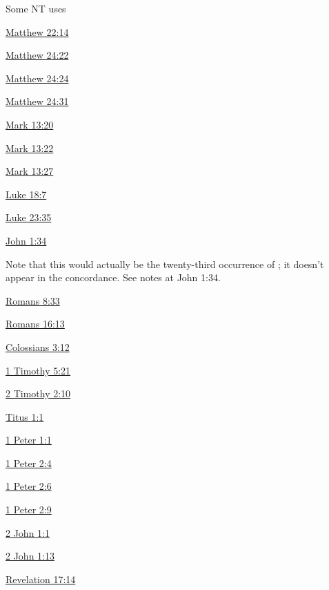 				\begin{compactdesc}
					\item[Some NT uses] \textbf{}
						\begin{compactdesc}
							\item[{\hyperref[MATTHEW-22-14]{Matthew 22:14}}]
							\item[{\hyperref[MATTHEW-24-22]{Matthew 24:22}}]
							\item[{\hyperref[MATTHEW-24-24]{Matthew 24:24}}]
							\item[{\hyperref[MATTHEW-24-31]{Matthew 24:31}}]
							\item[{\hyperref[MARK-13-20]{Mark 13:20}}]
							\item[{\hyperref[MARK-13-22]{Mark 13:22}}]
							\item[{\hyperref[MARK-13-27]{Mark 13:27}}]
							\item[{\hyperref[LUKE-18-7]{Luke 18:7}}]
							\item[{\hyperref[LUKE-23-35]{Luke 23:35}}]
							\item[{\hyperref[JOHN-1-34]{John 1:34}}] 
								\begin{compactitem}
									\item Note that this would actually be the twenty-third occurrence of ; it doesn't appear in the concordance. See notes at John 1:34.
								\end{compactitem}
							\item[{\hyperref[ROMANS-8-33]{Romans 8:33}}]
							\item[{\hyperref[ROMANS-16-13]{Romans 16:13}}]
							\item[{\hyperref[COLOSSIANS-3-12]{Colossians 3:12}}]
							\item[{\hyperref[1TIMOTHY-5-21]{1 Timothy 5:21}}]
							\item[{\hyperref[2TIMOTHY-2-10]{2 Timothy 2:10}}]
							\item[{\hyperref[TITUS-1-1]{Titus 1:1}}]
							\item[{\hyperref[1PETER-1-1]{1 Peter 1:1}}]
							\item[{\hyperref[1PETER-2-4]{1 Peter 2:4}}]
							\item[{\hyperref[1PETER-2-6]{1 Peter 2:6}}]
							\item[{\hyperref[1PETER-2-9]{1 Peter 2:9}}]
							\item[{\hyperref[2JOHN-1-1]{2 John 1:1}}]
							\item[{\hyperref[2JOHN-1-13]{2 John 1:13}}]
							\item[{\hyperref[REVELATIONNT-17-14]{Revelation 17:14}}]
						\end{compactdesc}
				\end{compactdesc}
				
